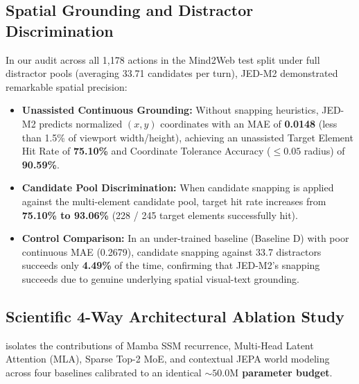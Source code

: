 \documentclass[10pt,twocolumn,letterpaper]{article}
\begin{document}
\subsection{Spatial Grounding and Distractor Discrimination}
\label{sec:distractors}

In our audit across all 1,178 actions in the Mind2Web test split under full distractor pools (averaging 33.71 candidates per turn), JED-M2 demonstrated remarkable spatial precision:
\begin{itemize}[leftmargin=*]
    \item \textbf{Unassisted Continuous Grounding:} Without snapping heuristics, JED-M2 predicts normalized $(x, y)$ coordinates with an MAE of \textbf{0.0148} (less than 1.5\% of viewport width/height), achieving an unassisted Target Element Hit Rate of \textbf{75.10\%} and Coordinate Tolerance Accuracy ($\le 0.05$ radius) of \textbf{90.59\%}.
    \item \textbf{Candidate Pool Discrimination:} When candidate snapping is applied against the multi-element candidate pool, target hit rate increases from \textbf{75.10\% to 93.06\%} (228 / 245 target elements successfully hit).
    \item \textbf{Control Comparison:} In an under-trained baseline (Baseline D) with poor continuous MAE (0.2679), candidate snapping against 33.7 distractors succeeds only \textbf{4.49\%} of the time, confirming that JED-M2's snapping succeeds due to genuine underlying spatial visual-text grounding.
\end{itemize}

\subsection{Scientific 4-Way Architectural Ablation Study}

 isolates the contributions of Mamba SSM recurrence, Multi-Head Latent Attention (MLA), Sparse Top-2 MoE, and contextual JEPA world modeling across four baselines calibrated to an identical \textbf{$\sim 50.0\text{M}$ parameter budget}.

\begin{table}[t]
\centering
\small
{}
\caption{\textbf{Architectural Ablation Parameter Parity \& Scaling.} Evaluated over 100 recurrent steps in native bfloat16.}
\label{tab:ablation}
\end{table}
\end{document}
